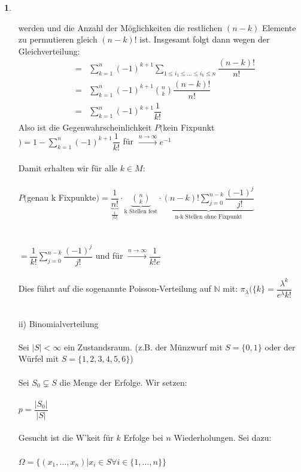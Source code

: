 \documentclass[10pt,a4paper]{report}
\numberwithin{equation}{section}
\numberwithin{figure}{section}
\theoremstyle{plain}
\theoremstyle{definition}
\theoremstyle{plain}
\theoremstyle{definition}
\newtheorem{example}{\protect\examplename}[section]
\theoremstyle{remark}
\theoremstyle{plain}
\theoremstyle{plain}
\theoremstyle{plain}
\theoremstyle{plain}
\theoremstyle{plain}
\providecommand{\examplename}{Beispiel}
\newcommand{\1}{ \mathbb{1} } %
\begin{document}
\begin{example}
\begin{itemize}
    werden und die Anzahl der Möglichkeiten die restlichen $(n-k)$
    Elemente zu permutieren gleich $(n-k)!$ ist. Insgesamt folgt dann
    wegen der Gleichverteilung:
    \begin{eqnarray*}
      &=&\sum\limits_{k=1}^n(-1)^{k+1}\sum\limits_{1\leq i_1 \leq \dots \leq i_k \leq n}\dfrac{(n-k)!}{n!}\\
      &=&\sum\limits_{k=1}^n(-1)^{k+1}\binom{n}{k}\dfrac{(n-k)!}{n!}\\
      &=&\sum\limits_{k=1}^n(-1)^{k+1}\dfrac{1}{k!}
    \end{eqnarray*}
    Also ist die Gegenwahrscheinlichkeit $P($kein Fixpunkt$)=1-\sum\limits_{k=1}^n(-1)^{k+1}\dfrac{1}{k!}$ für $\overset{n \to \infty}{\rightarrow} e^{-1}$\\\\
    Damit erhalten wir für alle $k \in M$:\\\\
    $P($genau k Fixpunkte$)=\underbrace{\dfrac{1}{n!}}_\frac{1}{|\Omega|}\cdot \underbrace{\binom{n}{k}}_{\text{k Stellen fest}}\cdot \underbrace{(n-k)!\sum\limits_{j=0}^{n-k}\dfrac{(-1)^j}{j!}}_{\text{n-k Stellen ohne Fixpunkt}}$\\\\\\
    $=\dfrac{1}{k!}\sum\limits_{j=0}^{n-k}\dfrac{(-1)^j}{j!}$ und für $\overset{n \to \infty}{\rightarrow} \dfrac{1}{k!e}$ \\\\
    Dies führt auf die sogenannte Poisson-Verteilung auf $\mathbb{N}$ mit: $\pi_\lambda(\{k\}=\dfrac{\lambda^k}{e^\lambda k!}$\\\\
    \item[ii)] Binomialverteilung\\\\
    Sei $|S|<\infty$ ein Zustandsraum. (z.B. der Münzwurf mit $S=\{0,1\}$ oder der Würfel mit $S=\{1,2,3,4,5,6\}$)\\\\
    Sei $S_0 \subsetneq S$ die Menge der Erfolge. Wir setzen:\\\\
    $p=\dfrac{|S_0|}{|S|}$\\\\
    Gesucht ist die W'keit für $k$ Erfolge bei $n$ Wiederholungen. Sei  dazu:\\\\
    $\Omega=\{(x_1,\dots,x_n)|x_i \in S \forall i \in \{1,\dots,n\}\}$\\\\

\end{itemize}
\end{example}
\end{document}
